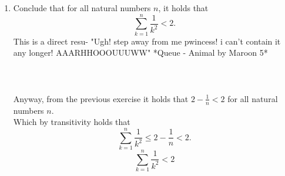 \documentclass[12pt]{article}
\begin{document}
\begin{enumerate}
\begin{align}
&= 2 - \frac{\Omega^2 + 2\Omega + 1 - \Omega}{\Omega(\Omega + 1)^2} \\
&= 2 - \frac{\Omega^2 + \Omega + 1}{\Omega(\Omega + 1)^2} \\
&= 2 - \frac{\Omega^2 + \Omega}{\Omega(\Omega + 1)^2} - \frac{1}{\Omega(\Omega + 1)^2} \\
&= 2 - \frac{\Omega(\Omega + 1)}{\Omega(\Omega + 1)^2} - \frac{1}{\Omega(\Omega + 1)^2} \\
&= 2 - \frac{1}{\Omega + 1} - \frac{1}{\Omega(\Omega + 1)^2}
\end{align}
\endgroup
At this point we have reduced it to a submissive and breedable form we can use \#BetaHumanTypeShiz\\
But we need to show that this is less than $2 - \frac{1}{\Omega + 1}$.
\[
2- \frac{1}{\Omega + 1} - \frac{1}{\Omega(\Omega + 1)^2} \leq 2 - \frac{1}{\Omega + 1}
\]
The term $\frac{1}{\Omega(\Omega + 1)^2}$ is always positive since $\Omega > 0$, and because it subtracted from $2-\frac{1}{\Omega + 1}$, which is on both sides of the inequality,
 it's clear as a true Alpha that the left side is a lesser beta, which means the inequality holds, and the induction step is complete, like the meeting of a true Alpha and it's destined Omega.\\\\
 In conclusion the following holds for all natural numbers $n$:
\[
    \sum_{k=1}^{n} \frac{1}{k^2} \leq 2 - \frac{1}{n}.
\]


    \item Conclude that for all natural numbers $n$, it holds that
    \[
        \sum_{k=1}^{n} \frac{1}{k^2} < 2.
    \]
    This is a direct resu- "Ugh! step away from me pwincess! i can't contain it any longer! AAARHHOOOUUUWW" *Queue - Animal by Maroon 5*\\\\\\\\
    Anyway, from the previous exercise it holds that $2 - \frac{1}{n} < 2$ for all natural numbers $n$.\\
    Which by transitivity holds that
    \[
        \sum_{k=1}^{n} \frac{1}{k^2} \leq 2 - \frac{1}{n} < 2.
    \]
    \[
    \sum_{k=1}^{n} \frac{1}{k^2} < 2
    \]
    

\end{enumerate}
\end{document}
